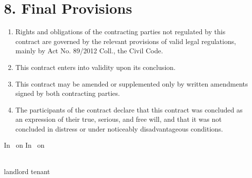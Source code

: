 \section*{8. Final Provisions}

\begin{enumerate}[label=\arabic*.]
    \item Rights and obligations of the contracting parties not regulated by this contract are governed by the relevant provisions of valid legal regulations, mainly by Act No. 89/2012 Coll., the Civil Code.
    \item This contract enters into validity upon its conclusion.
    \item This contract may be amended or supplemented only by written amendments signed by both contracting parties.
    \item The participants of the contract declare that this contract was concluded as an expression of their true, serious, and free will, and that it was not concluded in distress or under noticeably disadvantageous conditions.
\end{enumerate}

\vspace{2cm}

In \ContractPlace \ on \ContractDate \hfill In \underline{\hspace{3cm}} \ on \underline{\hspace{3cm}}

\vspace{1.5cm}

\underline{\hspace{5cm}} \hfill \underline{\hspace{5cm}} \\
landlord \hfill tenant \\
